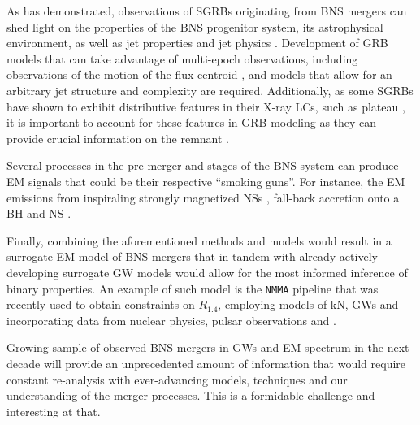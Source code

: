 As \GRB{} has demonstrated, observations of \acp{SGRB} originating from 
\ac{BNS} mergers can shed light on the properties of the \ac{BNS} 
progenitor system, its astrophysical environment, as well as jet properties 
and jet physics \citep[\eg][]{Hajela:2019mjy}. 
%
Development of \ac{GRB} models that can take advantage of multi-epoch observations, 
including observations of the motion of the flux centroid
\citep[\eg][]{Fernandez:2021xce}, and models that allow for an arbitrary 
jet structure and complexity are required.
%
Additionally, as some \acp{SGRB} have shown to exhibit distributive features 
in their X-ray \acp{LC}, such as plateau \citep{Kumar:2014upa}, it is important 
to account for these features in \ac{GRB} modeling as they can provide crucial 
information on the \pmerg{} remnant \citep[\eg][]{Gibson:2017dep}. 


Several processes in the pre-merger and \pmerg{} stages of the 
\ac{BNS} system can produce \ac{EM} signals that could be their respective 
``smoking guns''. 
%
For instance, the \ac{EM} emissions from inspiraling strongly magnetized \acp{NS} 
\citep[\eg][]{Beloborodov:2020ylo}, 
fall-back accretion onto a \ac{BH} \citep[\eg][]{Desai:2018rbc}
and \ac{NS} \citep[\eg][]{Gibson:2017dep}.


Finally, combining the aforementioned methods and models would result in a 
surrogate \ac{EM} model of \ac{BNS} mergers that in tandem with 
already actively developing surrogate \ac{GW} models would allow for 
the most informed inference of binary properties. 
%
An example of such model is the \texttt{NMMA} pipeline \citep{Dietrich:2020efo} that 
was recently used to obtain constraints on $R_{1.4}$, 
employing models of \ac{kN}, \acp{GW} and incorporating 
data from nuclear physics, pulsar observations and \GW{}.

Growing sample of observed \ac{BNS} mergers in \acp{GW} and \ac{EM} spectrum 
in the next decade will provide an unprecedented amount of information 
that would require constant re-analysis with ever-advancing models, 
techniques and our understanding of the merger processes.
%
This is a formidable challenge and interesting at that. 
%


